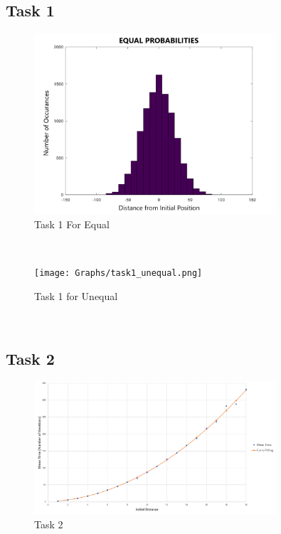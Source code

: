 \documentclass[answers]{exam}
\begin{document}
\subsection{Task 1}
\begin{figure}[H]
    \centering
    \includegraphics[width = 0.8\textwidth]{Graphs/task1_equal.png}
    \caption{Task 1 For Equal}
    \label{fig:task1_a}
\end{figure}\\
\begin{figure}[H]
    \centering
    \texttt{[image: Graphs/task1\_unequal.png]}
    \caption{Task 1 for Unequal}
    \label{fig:task1_b}
\end{figure}\\
\subsection{Task 2}
\begin{figure}[H]
    \centering
    \includegraphics[width = 0.8\textwidth]{Graphs/task2.PNG}
    \caption{Task 2}
    \label{fig:task2}
\end{figure}\\
\end{document}
